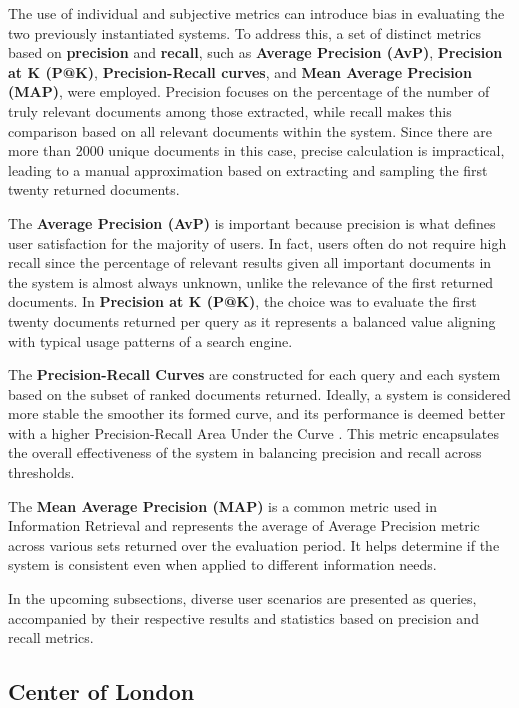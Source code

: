 \documentclass[sigconf]{acmart}
\begin{document}
The use of individual and subjective metrics can introduce bias in evaluating the two previously instantiated systems. To address this, a set of distinct metrics based on \textbf{precision} and \textbf{recall}, such as \textbf{Average Precision (AvP)}, \textbf{Precision at K (P@K)}, \textbf{Precision-Recall curves}, and \textbf{Mean Average Precision (MAP)}, were employed. Precision focuses on the percentage of the number of truly relevant documents among those extracted, while recall makes this comparison based on all relevant documents within the system. Since there are more than 2000 unique documents in this case, precise calculation is impractical, leading to a manual approximation based on extracting and sampling the first twenty returned documents.

The \textbf{Average Precision (AvP)} is important because precision is what defines user satisfaction for the majority of users. In fact, users often do not require high recall since the percentage of relevant results given all important documents in the system is almost always unknown, unlike the relevance of the first returned documents. In \textbf{Precision at K (P@K)}, the choice was to evaluate the first twenty documents returned per query as it represents a balanced value aligning with typical usage patterns of a search engine.

The \textbf{Precision-Recall Curves} are constructed for each query and each system based on the subset of ranked documents returned. Ideally, a system is considered more stable the smoother its formed curve, and its performance is deemed better with a higher Precision-Recall Area Under the Curve \cite{Precision_Recall}. This metric encapsulates the overall effectiveness of the system in balancing precision and recall across thresholds.

The \textbf{Mean Average Precision (MAP)} is a common metric used in Information Retrieval and represents the average of Average Precision metric across various sets returned over the evaluation period. It helps determine if the system is consistent even when applied to different information needs.

In the upcoming subsections, diverse user scenarios are presented as queries, accompanied by their respective results and statistics based on precision and recall metrics.

\renewcommand{\thesubsection}{\Alph{subsection}}

\subsection{Center of London}
\end{document}
